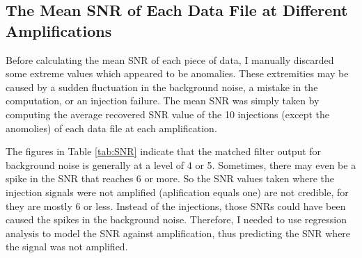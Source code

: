 \documentclass[aps,prd,preprint]{revtex4}
\begin{document}
\subsection{The Mean SNR of Each Data File at Different Amplifications}
Before calculating the mean SNR of each piece of data, I manually discarded some extreme values which appeared to be anomalies. These extremities may be caused by a sudden fluctuation in the background noise, a mistake in the computation, or an injection failure. The mean SNR was simply taken by computing the average recovered SNR value of the 10 injections (except the anomolies) of each data file at each amplification.
\par The figures in Table \ref{tab:SNR} indicate that the matched filter output for background noise is generally at a level of 4 or 5. Sometimes, there may even be a spike in the SNR that reaches 6 or more. So the SNR values taken where the injection signals were not amplified (aplification equals one) are not credible, for they are mostly 6 or less. Instead of the injections, those SNRs could have been caused the spikes in the background noise. Therefore, I needed to use regression analysis to model the SNR against amplification, thus predicting the SNR where the signal was not amplified.
\end{document}
